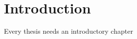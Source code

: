 \chapter{Introduction}

Every thesis needs an introductory chapter

\lipsum[2-4]
\lipsum[2-4] \cite{popescu2014gamygdala}